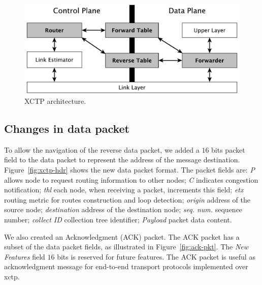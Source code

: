 \begin{figure}[t]
\centerline{
    \includegraphics[width=0.8\linewidth]{img/architecture}
} \caption{XCTP architecture.} \label{fig:architecture}
\end{figure}

\subsection{Changes in data packet}
\label{sec:changes-in-data-packet}

To allow the navigation of the reverse data packet, we added a $16$
bits packet field to the data packet to represent the address of the
message destination. Figure~\ref{fig:xctp-hdr} shows the new data
packet format. The packet fields are: \textit{P} allows node to
request routing information to other nodes; \textit{C} indicates
congestion notification; \textit{\ac{thl}} each node, when receiving
a packet, increments this field; \textit{\acs{etx}} routing metric
for routes construction and loop detection; \textit{origin} address
of the source node; \textit{destination} address of the destination
node; \textit{seq. num.} sequence number; \textit{collect ID}
collection tree identifier; \textit{Payload} packet data content.

We also created an Acknowledgment (ACK) packet. The ACK packet has a
subset of the data packet fields, as illustrated in
Figure~\ref{fig:ack-pkt}. The \textit{New Features} field $16$ bits
is reserved for future features. The ACK packet is useful as
acknowledgment message for end-to-end transport protocols
implemented over \ac{xctp}.


